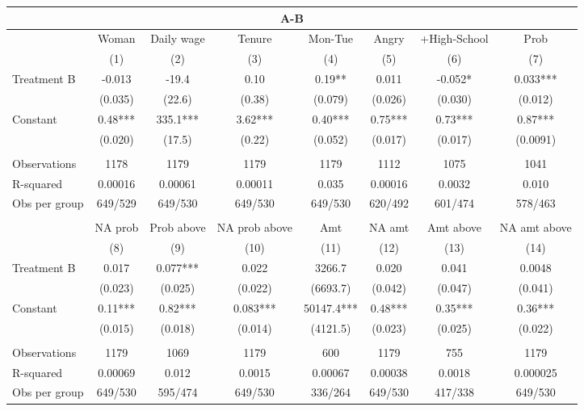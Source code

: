 \begin{tabular}{lccccccc}
\toprule
\multicolumn{8}{c}{A-B} \\
\midrule
\midrule
      & Woman  & Daily wage & Tenure & Mon-Tue & Angry & +High-School & Prob \\
\midrule
\midrule
      & (1)   & (2)   & (3)   & (4)   & (5)   & (6)   & (7) \\
\midrule
Treatment B & -0.013 & -19.4 & 0.10  & 0.19** & 0.011 & -0.052* & 0.033*** \\
      & (0.035) & (22.6) & (0.38) & (0.079) & (0.026) & (0.030) & (0.012) \\
Constant  & 0.48*** & 335.1*** & 3.62*** & 0.40*** & 0.75*** & 0.73*** & 0.87*** \\
      & (0.020) & (17.5) & (0.22) & (0.052) & (0.017) & (0.017) & (0.0091) \\
      &       &       &       &       &       &       &  \\
\midrule
Observations & 1178  & 1179  & 1179  & 1179  & 1112  & 1075  & 1041 \\
R-squared & 0.00016 & 0.00061 & 0.00011 & 0.035 & 0.00016 & 0.0032 & 0.010 \\
Obs per group & 649/529 & 649/530 & 649/530 & 649/530 & 620/492 & 601/474 & 578/463 \\
\midrule
\midrule
      &       &       &       &       &       &       &  \\
      & NA prob & Prob above & NA prob above & Amt   & NA amt & Amt above & NA amt above \\
\midrule
\midrule
      & (8)   & (9)   & (10)  & (11)  & (12)  & (13)  & (14) \\
\midrule
Treatment B & 0.017 & 0.077*** & 0.022 & 3266.7 & 0.020 & 0.041 & 0.0048 \\
      & (0.023) & (0.025) & (0.022) & (6693.7) & (0.042) & (0.047) & (0.041) \\
Constant  & 0.11*** & 0.82*** & 0.083*** & 50147.4*** & 0.48*** & 0.35*** & 0.36*** \\
      & (0.015) & (0.018) & (0.014) & (4121.5) & (0.023) & (0.025) & (0.022) \\
      &       &       &       &       &       &       &  \\
\midrule
Observations & 1179  & 1069  & 1179  & 600   & 1179  & 755   & 1179 \\
R-squared & 0.00069 & 0.012 & 0.0015 & 0.00067 & 0.00038 & 0.0018 & 0.000025 \\
Obs per group & 649/530 & 595/474 & 649/530 & 336/264 & 649/530 & 417/338 & 649/530 \\
\bottomrule
\bottomrule
\end{tabular}%
